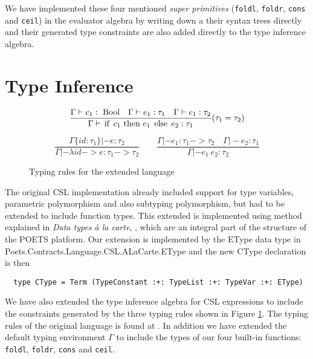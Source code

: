 \documentclass[10pt,a4paper,final,oneside,openany,article]{memoir}
\newcommand{\kw}[1]{\text{\lstinline{#1}}}
\begin{document}
We have implemented these four mentioned \textit{super primitives}
(\lstinline{foldl}, \lstinline{foldr}, \lstinline{cons} and
\lstinline{ceil}) in the evaluator algebra by writing down a their
syntax trees directly and their generated type constraints are also
added directly to the type inference algebra.

\section{Type Inference}
\begin{figure}
  \begin{equation*}
    \frac{
      \Gamma |- c_1 : ~\kw{Bool}
      \quad \Gamma |- e_1 : \tau_1
      \quad \Gamma |- e_1 : \tau_2
    }{
      \Gamma |- \kw{if}~ c_1 ~\kw{then}~ e_1 ~\kw{else}~ e_2 : \tau_1
    }(\tau_1=\tau_2)\label{eq:type_cond}
  \end{equation*}

\begin{equation*}
  \frac{
    \Gamma\{id : \tau_1\} |- e : \tau_2
  }{
    \Gamma |- \lambda id -> e : \tau_1 -> \tau_2
  }
  \quad \quad
  \frac{
    \Gamma |- e_1 : \tau_1 -> \tau_2
    \quad \Gamma |- e_2 : \tau_1
  }{
    \Gamma |- e_1~ e_2 : \tau_2
  }\label{eq:type_apply}
\end{equation*}

\caption{Typing rules for the extended language}
\label{fig:typing_rules}
\end{figure}
The original CSL implementation already included support for type
variables, parametric polymorphism and also subtyping polymorphism,
but had to be extended to include function types.  This extended is
implemented using method explained in \textit{Data types à la carte},
\cite{swierstra2008data}, which are an integral part of the structure
of the POETS platform. Our extension is implemented by the EType
data type in Poets.Contracts.Language.CSL.ALaCarte.EType and the new
CType declaration is then
\begin{lstlisting}
  type CType = Term (TypeConstant :+: TypeList :+: TypeVar :+: EType)
\end{lstlisting}

We have also extended the type inference algebra for CSL expressions
to include the constraints generated by the three typing rules shown
in Figure \ref{fig:typing_rules}. The typing rules of the original
language is found at \cite[page 17, Figure
3]{hvitved10}. 
In addition we have extended the default typing environment $\Gamma$
to include the types of our four built-in functions:
\lstinline{foldl}, \lstinline{foldr}, \lstinline{cons} and
\lstinline{ceil}.
\end{document}
